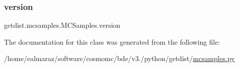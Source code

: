 \mbox{\label{classgetdist_1_1mcsamples_1_1MCSamples_a127a745102f1bd4b4d0d21f95db0f016}} 
\subsubsection{\texorpdfstring{version}{version}}
{\footnotesize\ttfamily getdist.\+mcsamples.\+M\+C\+Samples.\+version}



The documentation for this class was generated from the following file\+:\begin{DoxyCompactItemize}
\item 
/home/ealmaraz/software/cosmomc/bde/v3./python/getdist/\mbox{\hyperlink{mcsamples_8py}{mcsamples.\+py}}\end{DoxyCompactItemize}
